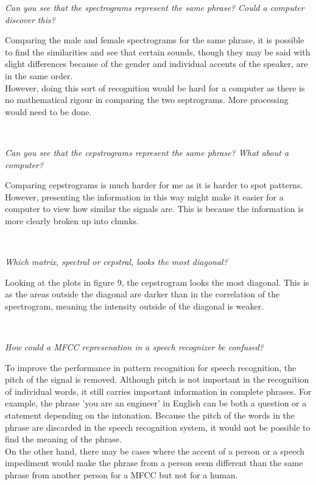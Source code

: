 \documentclass[11pt]{article}   %
\begin{document}
\textit{Can you see that the spectrograms represent the same phrase? Could a computer discover this?}\\

\begin{adjustwidth}{2.5em}{0pt}
Comparing the male and female spectrograms for the same phrase, it is possible to find the similarities and see that certain sounds, though they may be said with slight differences because of the gender and individual accents of the speaker, are in the same order. \\

However, doing this sort of recognition would be hard for a computer as there is no mathematical rigour in comparing the two septrograms. More processing would need to be done.

\end{adjustwidth}\

\textit{Can you see that the cepstrograms represent the same phrase? What about a computer?}\\

\begin{adjustwidth}{2.5em}{0pt}
Comparing cepstrograms is much harder for me as it is harder to spot patterns. However, presenting the information in this way might make it easier for a computer to view how similar the signals are. This is because the information is more clearly broken up into chunks.
\end{adjustwidth}\

\textit{Which matrix, spectral or cepstral, looks the most diagonal?}\\

\begin{adjustwidth}{2.5em}{0pt}
Looking at the plots in figure 9, the cepstrogram looks the most diagonal. This is as the areas outside the diagonal are darker than in the correlation of the spectrogram, meaning the intensity outside of the diagonal is weaker.

\end{adjustwidth}\

\textit{How could a MFCC represenation in a speech recognizer be confused?}\\

\begin{adjustwidth}{2.5em}{0pt}
To improve the performance in pattern recognition for speech recognition, the pitch of the signal is removed. Although pitch is not important in the recognition of individual words, it still carries important information in complete phrases. For example, the phrase 'you are an engineer' in English can be both a question or a statement depending on the intonation. Because the pitch of the words in the phrase are discarded in the speech recognition system, it would not be possible to find the meaning of the phrase. \\

On the other hand, there may be cases where the accent of a person or a speech impediment would make the phrase from a person seem different than the same phrase from another person for a MFCC but not for a human.\end{adjustwidth}\
\end{document}
